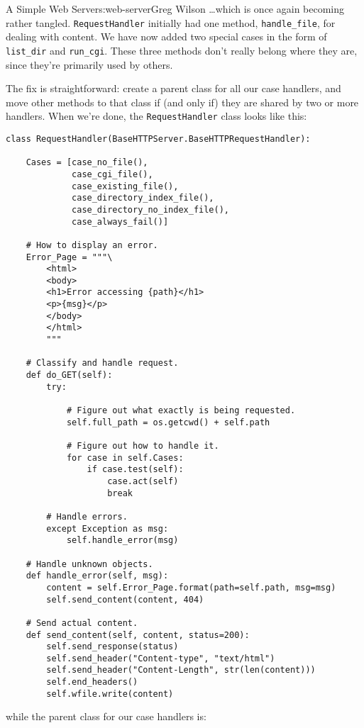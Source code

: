 \begin{aosachapter}{A Simple Web Server}{s:web-server}{Greg Wilson}
\ldots{}which is once again becoming rather tangled.
\texttt{RequestHandler} initially had one method, \texttt{handle\_file},
for dealing with content. We have now added two special cases in the
form of \texttt{list\_dir} and \texttt{run\_cgi}. These three methods
don't really belong where they are, since they're primarily used by
others.

The fix is straightforward: create a parent class for all our case
handlers, and move other methods to that class if (and only if) they are
shared by two or more handlers. When we're done, the
\texttt{RequestHandler} class looks like this:

\begin{verbatim}
class RequestHandler(BaseHTTPServer.BaseHTTPRequestHandler):

    Cases = [case_no_file(),
             case_cgi_file(),
             case_existing_file(),
             case_directory_index_file(),
             case_directory_no_index_file(),
             case_always_fail()]

    # How to display an error.
    Error_Page = """\
        <html>
        <body>
        <h1>Error accessing {path}</h1>
        <p>{msg}</p>
        </body>
        </html>
        """

    # Classify and handle request.
    def do_GET(self):
        try:

            # Figure out what exactly is being requested.
            self.full_path = os.getcwd() + self.path

            # Figure out how to handle it.
            for case in self.Cases:
                if case.test(self):
                    case.act(self)
                    break

        # Handle errors.
        except Exception as msg:
            self.handle_error(msg)

    # Handle unknown objects.
    def handle_error(self, msg):
        content = self.Error_Page.format(path=self.path, msg=msg)
        self.send_content(content, 404)

    # Send actual content.
    def send_content(self, content, status=200):
        self.send_response(status)
        self.send_header("Content-type", "text/html")
        self.send_header("Content-Length", str(len(content)))
        self.end_headers()
        self.wfile.write(content)
\end{verbatim}

while the parent class for our case handlers is:


\end{aosachapter}
